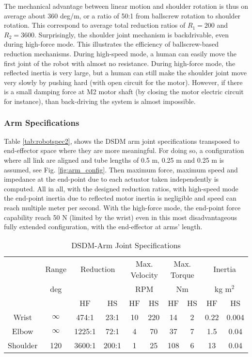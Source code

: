 The mechanical advantage between linear motion and shoulder rotation is thus on average about 360 deg/m, or a ratio of 50:1 from ballscrew rotation to shoulder rotation. This correspond to average total reduction ratios of $R_1 = 200 $ and $R_2 = 3600 $. Surprisingly, the shoulder joint mechanism is backdrivable, even during high-force mode. This illustrates the efficiency of ballscrew-based reduction mechanisms. During high-speed mode, a human can easily move the first joint of the robot with almost no resistance. During high-force mode, the reflected inertia is very large, but a human can still make the shoulder joint move very slowly by pushing hard (with open circuit for the motor). However, if there is a small damping force at M2 motor shaft (by closing the motor electric circuit for instance), than back-driving the system is almost impossible.  


\subsubsection{Arm Specifications} 

Table \ref{tab:robotspec2}, shows the DSDM arm joint specifications transposed to end-effector space where they are more meaningful. For doing so, a configuration where all link are aligned and tube lengths of 0.5 m, 0.25 m and 0.25 m is assumed, see Fig. \ref{fig:arm_config}. Then maximum force, maximum speed and impedance at the end-point due to each actuator taken independently is computed. All in all, with the designed reduction ratios, with high-speed mode the end-point inertia due to reflected motor inertia is negligible and speed can reach multiple meter per second. With the high-force mode, the end-point force capability reach 50 N (limited by the wrist) even in this most disadvantageous fully extended configuration, with the end-effector at arms' length.  

\begin{table}[htbp]
	\centering
	\caption{DSDM-Arm Joint Specifications}
		\begin{tabular}{ c c c c c c c c c c }
			\hline
			   & Range  & \multicolumn{2}{c}{Reduction} & \multicolumn{2}{c}{Max. Velocity} & \multicolumn{2}{c}{Max. Torque} & \multicolumn{2}{c}{Inertia} \\
			   & deg & & &\multicolumn{2}{c}{RPM} & \multicolumn{2}{c}{Nm} & \multicolumn{2}{c}{kg m$^2$} \\
				\hline 
			  & & HF & HS & HF & HS & HF & HS & HF & HS \\
			\hline
			 Wrist & $\infty$ & 474:1  & 23:1  & 10 & 220 & 14  & 2 & 0.22 & 0.004 \\
			 Elbow & $\infty$ & 1225:1 & 72:1  & 4  & 70  & 37  & 7 & 1.5  & 0.04  \\
			 Shoulder & 120   & 3600:1 & 200:1 & 1  & 25  & 108 & 6 & 13   & 0.04  \\
			\hline
		\end{tabular}
	\label{tab:robotspec}
\end{table}

